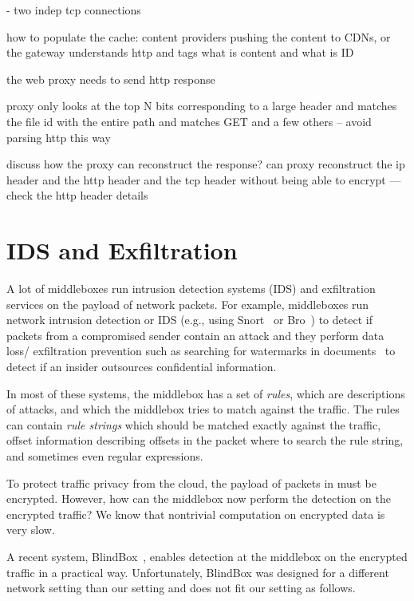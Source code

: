 - two indep tcp connections 

how to populate the cache: content providers pushing the content to CDNs, or the gateway understands
http and tags what is content and what is ID

the web proxy needs to send http response 

proxy only looks at the top N bits corresponding to a large header and matches the file id with the entire path
and matches GET and a few others -- avoid parsing http this way


discuss how the proxy can reconstruct the response?
can proxy reconstruct the ip header and the http header  and the tcp header without being able to encrypt
--- check the http header details


\section{IDS and Exfiltration}\label{sec:IDS}


A lot of middleboxes run intrusion detection systems (IDS) and exfiltration services on the payload of network packets.
For example, middleboxes run network intrusion detection or IDS (e.g., using  Snort~\cite{Snort} 
or Bro~\cite{Bro}) to detect if packets from a compromised sender contain an attack and they 
perform data loss/ exfiltration prevention such as searching for watermarks in 
documents~\cite{CMU_exfiltration_report} to detect if an insider outsources confidential information.

In most of these systems, the middlebox has a set of {\em rules}, which are descriptions of attacks, and which 
the middlebox tries to match against the traffic. The rules can contain {\em rule strings} which should be matched
exactly against the traffic, offset information describing offsets in the packet where to search the rule string, and
sometimes even regular expressions.

To protect traffic privacy from the cloud, the payload of packets in \sys must be encrypted. 
However, how can the middlebox now perform the detection on the encrypted traffic? 
We know that nontrivial computation on encrypted data is very slow. ~\cite{CITE}

A recent system, BlindBox~,  enables detection at the middlebox on the encrypted traffic
in a practical way. 
Unfortunately, BlindBox was designed for a different network setting than our setting 
and does not fit our setting  as follows.


